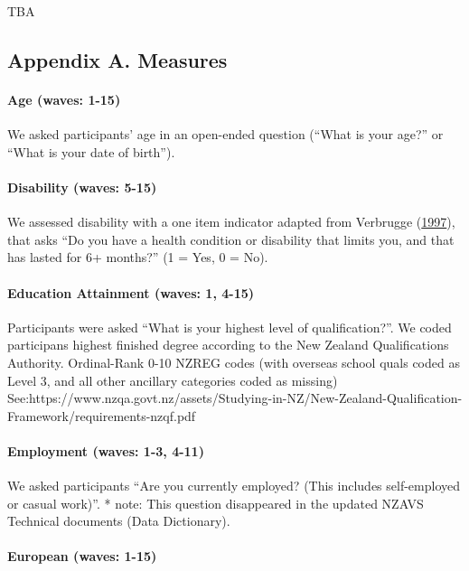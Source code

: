 \documentclass[
  singlecolumn,
  9pt]{article}
\let\oldparagraph\paragraph
\renewcommand{\paragraph}[1]{\oldparagraph{#1}\mbox{}}
\begin{document}
TBA

\newpage{}

\subsection{Appendix A. Measures}\label{appendix-a.-measures}

\paragraph{Age (waves: 1-15)}\label{age-waves-1-15}

We asked participants' age in an open-ended question (``What is your
age?'' or ``What is your date of birth'').

\paragraph{Disability (waves: 5-15)}\label{disability-waves-5-15}

We assessed disability with a one item indicator adapted from Verbrugge
(\hyperref[ref-verbrugge1997]{1997}), that asks ``Do you have a health
condition or disability that limits you, and that has lasted for 6+
months?'' (1 = Yes, 0 = No).

\paragraph{Education Attainment (waves: 1,
4-15)}\label{education-attainment-waves-1-4-15}

Participants were asked ``What is your highest level of
qualification?''. We coded participans highest finished degree according
to the New Zealand Qualifications Authority. Ordinal-Rank 0-10 NZREG
codes (with overseas school quals coded as Level 3, and all other
ancillary categories coded as missing)
See:https://www.nzqa.govt.nz/assets/Studying-in-NZ/New-Zealand-Qualification-Framework/requirements-nzqf.pdf

\paragraph{Employment (waves: 1-3,
4-11)}\label{employment-waves-1-3-4-11}

We asked participants ``Are you currently employed? (This includes
self-employed or casual work)''. * note: This question disappeared in
the updated NZAVS Technical documents (Data Dictionary).

\paragraph{European (waves: 1-15)}\label{european-waves-1-15}
\end{document}
